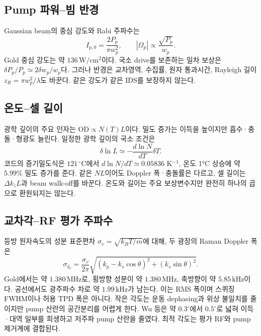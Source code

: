 \documentclass[11pt,a4paper]{article}
\newcommand{\MHz}{\,\mathrm{MHz}}
\newcommand{\kHz}{\,\mathrm{kHz}}
\newcommand{\degC}{\,^{\circ}\mathrm C}
\begin{document}
\subsection{Pump 파워--빔 반경}
Gaussian beam의 중심 강도와 Rabi 주파수는
\begin{equation}
 I_{p,0}=\frac{2P_p}{\pi w_p^2},\qquad
 |\Omega_p|\propto\frac{\sqrt{P_p}}{w_p}.
\end{equation}
Gold 중심 강도는 약 $136\,\mathrm{W/cm^2}$이다. 국소 drive를
보존하는 일차 보상은 $\delta P_p/P_p\simeq2\delta w_p/w_p$다.
그러나 반경은 교차영역, 수집률, 원자 통과시간, Rayleigh 길이
$z_R=\pi w_p^2/\lambda$도 바꾼다. 같은 강도가 같은 IDS를 보장하지 않는다.

\subsection{온도--셀 길이}
광학 깊이의 주요 인자는 $\mathrm{OD}\propto N(T)L$이다.
밀도 증가는 이득을 높이지만 흡수·충돌·형광도 늘린다.
일정한 광학 깊이의 국소 조건은
\begin{equation}
 \delta\ln L\simeq-\frac{d\ln N}{dT}\delta T.
\end{equation}
코드의 증기밀도식은 $121\degC$에서 $d\ln N/dT\simeq0.05836$
K$^{-1}$, 온도 1°C 상승에 약 $5.99\%$ 밀도 증가를 준다.
같은 $NL$이어도 Doppler 폭·충돌률은 다르고, 셀 길이는
$\Delta k_zL$과 beam walk-off를 바꾼다. 온도와 길이는 주요 보상변수지만
완전히 하나의 곱으로 환원되지는 않는다.

\subsection{교차각--RF 평가 주파수}
등방 원자속도의 성분 표준편차 $\sigma_v=\sqrt{k_BT/m}$에 대해,
두 광장의 Raman Doppler 폭은
\begin{equation}
 \sigma_{\delta_\nu}=\frac{\sigma_v}{2\pi}
 \sqrt{(k_p-k_s\cos\theta)^2+(k_s\sin\theta)^2}.
 \label{eq:angle}
\end{equation}
Gold에서는 약 $1.380\MHz$로, 횡방향 성분이 약 $1.380\MHz$,
축방향이 약 $5.85\kHz$이다. 공선에서도 광주파수 차로 약 $1.99\kHz$가
남는다. 이는 RMS 폭이며 스퀴징 FWHM이나 허용 TPD 폭은 아니다.
작은 각도는 운동 dephasing과 위상 불일치를 줄이지만 pump 산란의
공간분리를 어렵게 한다. Wu 등은 약 $0.3^\circ$에서 $0.5^\circ$로
넓혀 이득·대역 일부를 희생하고 저주파 pump 산란을 줄였다\cite{wu}.
최적 각도는 평가 RF와 pump 제거계에 결합된다.
\end{document}

